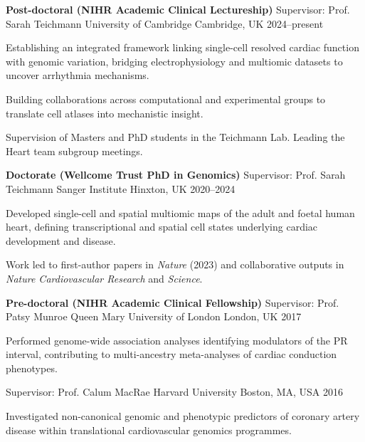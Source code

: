 
\begin{cventries}

\textbf{Post-doctoral (NIHR Academic Clinical Lectureship)}  
\cventry
  {Supervisor: Prof. Sarah Teichmann}
  {University of Cambridge}
  {Cambridge, UK}
  {2024–present}
  {
    \begin{cvitems}
      \item {Establishing an integrated framework linking single-cell resolved cardiac function with genomic variation, bridging electrophysiology and multiomic datasets to uncover arrhythmia mechanisms.}
      \item {Building collaborations across computational and experimental groups to translate cell atlases into mechanistic insight.}
      \item {Supervision of Masters and PhD students in the Teichmann Lab. Leading the Heart team subgroup meetings.}
    \end{cvitems}
  }

\newpage
\textbf{Doctorate (Wellcome Trust PhD in Genomics)}  
\cventry
  {Supervisor: Prof. Sarah Teichmann}
  {Sanger Institute}
  {Hinxton, UK}
  {2020–2024}
  {
    \begin{cvitems}
      \item {Developed single-cell and spatial multiomic maps of the adult and foetal human heart, defining transcriptional and spatial cell states underlying cardiac development and disease.}
      \item {Work led to first-author papers in \textit{Nature} (2023) and collaborative outputs in \textit{Nature Cardiovascular Research} and \textit{Science}.}
    \end{cvitems}
  }

\textbf{Pre-doctoral (NIHR Academic Clinical Fellowship)}  
\cventry
  {Supervisor: Prof. Patsy Munroe}
  {Queen Mary University of London}
  {London, UK}
  {2017}
  {
    \begin{cvitems}
      \item {Performed genome-wide association analyses identifying modulators of the PR interval, contributing to multi-ancestry meta-analyses of cardiac conduction phenotypes.}
    \end{cvitems}
  }

\cventry
  {Supervisor: Prof. Calum MacRae}
  {Harvard University}
  {Boston, MA, USA}
  {2016}
  {
    \begin{cvitems}
      \item {Investigated non-canonical genomic and phenotypic predictors of coronary artery disease within translational cardiovascular genomics programmes.}
    \end{cvitems}
  }


\end{cventries}
